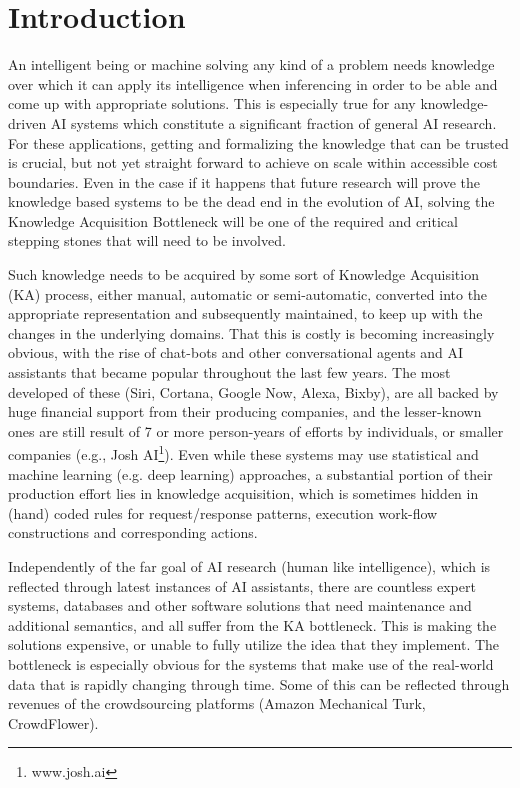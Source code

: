 % 
\chapter{Introduction}
An intelligent being or machine solving any kind of a problem needs knowledge 
over which it can apply its intelligence when inferencing in order to be able
and come up with appropriate solutions. This is especially true for any 
knowledge-driven AI systems which constitute a significant fraction of general 
AI research. For these applications, getting and formalizing the knowledge that
can be trusted is crucial, but not yet straight forward to achieve on scale 
within accessible cost boundaries. Even in the case if it happens that future 
research will prove the knowledge based systems to be the dead end in the
evolution of AI, solving the Knowledge Acquisition 
Bottleneck\parencite{Wagner2006} will be one of the required and critical 
stepping stones that will need to be involved.

Such knowledge needs to be acquired by some sort of Knowledge Acquisition (KA) 
process, either manual, automatic or semi-automatic, converted into the
appropriate representation and subsequently maintained, to keep up with the
changes in the underlying domains. That this is costly is becoming 
increasingly obvious, with the rise of chat-bots and other conversational 
agents and AI assistants that became popular throughout the last few years. 
The most developed of these (Siri, Cortana, Google Now, Alexa, Bixby), are 
all backed by huge financial support from their producing companies, and the 
lesser-known ones are still result of 7 or more person-years of efforts by
individuals\parencite{Wilcox2011, Wallace2013}, or smaller companies (e.g.,
Josh AI\footnote{www.josh.ai}). Even while these systems may use statistical
and machine learning (e.g. deep learning) approaches, a substantial 
portion of their production effort lies in knowledge acquisition, which is 
sometimes hidden in (hand) coded rules for request/response patterns, execution
work-flow constructions and corresponding actions.

Independently of the far goal of AI research (human like intelligence), which
is reflected through latest instances of AI assistants, there are countless 
expert systems, databases and other software solutions that need maintenance
and additional semantics, and all suffer from the KA bottleneck. This is making
the solutions expensive, or unable to fully utilize the idea that they 
implement. The bottleneck is especially obvious for the systems that make use 
of the real-world data that is rapidly changing through time. Some of this can
be reflected through revenues of the crowdsourcing platforms (Amazon Mechanical
Turk, CrowdFlower).

